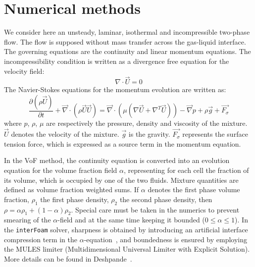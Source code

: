 \documentclass[review]{elsarticle}
\begin{document}
\section{Numerical methods}
We consider here an unsteady, laminar, isothermal and incompressible two-phase flow. The flow is supposed without mass transfer across the gas-liquid interface. The governing equations are the continuity and linear momentum equations. The incompressibility condition is written as a divergence free equation for the velocity field:
\begin{equation}
  \nabla \cdot \overrightarrow{U} = 0
\end{equation}
The Navier-Stokes equations for the momentum evolution are written as: 
\begin{equation}
  \frac{\partial(\rho \overrightarrow{U})}{\partial t} + 
  \overrightarrow{\nabla} \cdot (\rho\overrightarrow{U}\overrightarrow{U}) = 
  \overrightarrow{\nabla} \cdot \left( \mu (\nabla\overrightarrow{U}+\nabla^T\overrightarrow{U})\right)
  - \overrightarrow{\nabla} p + \rho \overrightarrow{g} + \overrightarrow{F_{\sigma}}
\end{equation}
where $p$, $\rho$, $\mu$ are respectively the pressure, density and viscosity of the mixture. $\overrightarrow{U}$ denotes the velocity of the mixture. $\overrightarrow{g}$ is the gravity. $\overrightarrow{F_{\sigma}}$ represents the surface tension force, which is expressed as a source term in the momentum equation. 

In the VoF method, the continuity equation is converted into an evolution equation for the volume fraction field $\alpha$, representing for each cell the fraction of its volume, which is occupied by one of the two fluids. Mixture quantities are defined as volume fraction weighted sums. If $\alpha$ denotes the first phase volume fraction, $\rho_1$ the first phase density, $\rho_2$ the second phase density, then $\rho = \alpha\rho_1 + (1-\alpha)\rho_2$. 
Special care must be taken in the numerics to prevent smearing of the $\alpha$-field and at the same time keeping it bounded ($0\leq \alpha\leq 1$). In the \verb|interFoam| solver, sharpness is obtained by introducing an artificial interface compression term in the $\alpha$-equation~\cite{Weller2008}, and boundedness is ensured by employing the MULES limiter (Multidimensional Universal Limiter with Explicit Solution). More details can be found in Deshpande~\cite{Deshpande2012}.
\end{document}
